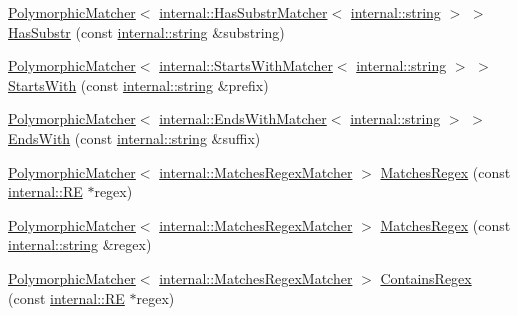 \begin{DoxyCompactItemize}
\item 
\hyperlink{classtesting_1_1PolymorphicMatcher}{Polymorphic\+Matcher}$<$ \hyperlink{classtesting_1_1internal_1_1HasSubstrMatcher}{internal\+::\+Has\+Substr\+Matcher}$<$ \hyperlink{namespacetesting_1_1internal_a8e8ff5b11e64078831112677156cb111}{internal\+::string} $>$ $>$ \hyperlink{namespacetesting_a7d27682e38d57eea81ba145a2772e1c7}{Has\+Substr} (const \hyperlink{namespacetesting_1_1internal_a8e8ff5b11e64078831112677156cb111}{internal\+::string} \&substring)
\item 
\hyperlink{classtesting_1_1PolymorphicMatcher}{Polymorphic\+Matcher}$<$ \hyperlink{classtesting_1_1internal_1_1StartsWithMatcher}{internal\+::\+Starts\+With\+Matcher}$<$ \hyperlink{namespacetesting_1_1internal_a8e8ff5b11e64078831112677156cb111}{internal\+::string} $>$ $>$ \hyperlink{namespacetesting_ae0502232432b1fe8361d296c6de6beda}{Starts\+With} (const \hyperlink{namespacetesting_1_1internal_a8e8ff5b11e64078831112677156cb111}{internal\+::string} \&prefix)
\item 
\hyperlink{classtesting_1_1PolymorphicMatcher}{Polymorphic\+Matcher}$<$ \hyperlink{classtesting_1_1internal_1_1EndsWithMatcher}{internal\+::\+Ends\+With\+Matcher}$<$ \hyperlink{namespacetesting_1_1internal_a8e8ff5b11e64078831112677156cb111}{internal\+::string} $>$ $>$ \hyperlink{namespacetesting_aec11c4e418a835ca2c0c3cbdb29b28ba}{Ends\+With} (const \hyperlink{namespacetesting_1_1internal_a8e8ff5b11e64078831112677156cb111}{internal\+::string} \&suffix)
\item 
\hyperlink{classtesting_1_1PolymorphicMatcher}{Polymorphic\+Matcher}$<$ \hyperlink{classtesting_1_1internal_1_1MatchesRegexMatcher}{internal\+::\+Matches\+Regex\+Matcher} $>$ \hyperlink{namespacetesting_a4dac232f315edc259b62ce88e413b107}{Matches\+Regex} (const \hyperlink{classtesting_1_1internal_1_1RE}{internal\+::\+RE} $\ast$regex)
\item 
\hyperlink{classtesting_1_1PolymorphicMatcher}{Polymorphic\+Matcher}$<$ \hyperlink{classtesting_1_1internal_1_1MatchesRegexMatcher}{internal\+::\+Matches\+Regex\+Matcher} $>$ \hyperlink{namespacetesting_afea6e0eaf0ae69b409fc1c0285df6c8c}{Matches\+Regex} (const \hyperlink{namespacetesting_1_1internal_a8e8ff5b11e64078831112677156cb111}{internal\+::string} \&regex)
\item 
\hyperlink{classtesting_1_1PolymorphicMatcher}{Polymorphic\+Matcher}$<$ \hyperlink{classtesting_1_1internal_1_1MatchesRegexMatcher}{internal\+::\+Matches\+Regex\+Matcher} $>$ \hyperlink{namespacetesting_a899838630a71376aa071dfd7c500f2ca}{Contains\+Regex} (const \hyperlink{classtesting_1_1internal_1_1RE}{internal\+::\+RE} $\ast$regex)

\end{DoxyCompactItemize}
